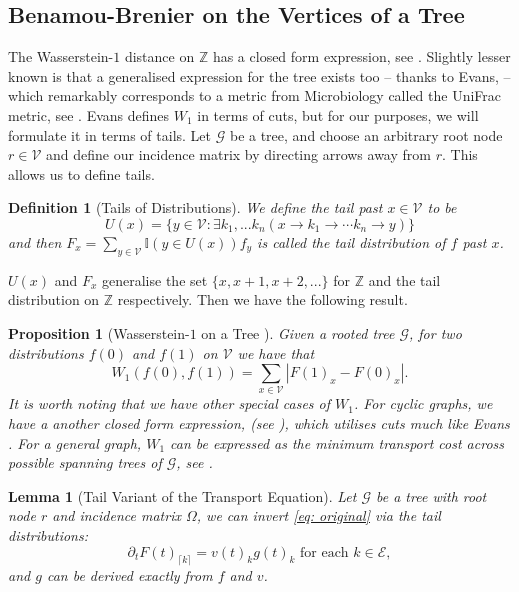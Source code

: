 \documentclass[conference]{IEEEtran}
\newcommand{\GG}{\mathcal{G}}
\newcommand{\VV}{\mathcal{V}}
\newcommand{\EE}{\mathcal{E}}
\newcommand{\ceil}[1]{\lceil #1 \rceil}
\theoremstyle{ieeestyle}
\newtheorem{lem}{Lemma}
\newtheorem{prop}{Proposition}
\newtheorem{defn}{Definition}
\begin{document}
\subsection{Benamou-Brenier on the Vertices of a Tree}\label{sect: tree}
The Wasserstein-$1$ distance on $\mathbb{Z}$ has a closed form expression, see \cite[Lemma 8.2]{bickel1981some}. Slightly lesser known is that a generalised expression for the tree exists too -- thanks to Evans, \cite{evans2012phylogenetic}  -- which remarkably corresponds to a metric from Microbiology called the UniFrac metric, see \cite{lozupone2005unifrac}. Evans defines $W_1$ in terms of cuts, but for our purposes, we will formulate it in terms of tails. Let $\GG$ be a tree, and choose an arbitrary root node $r \in \VV$ and define our incidence matrix by directing arrows away from $r$. This allows us to define tails.
\begin{defn}[Tails of Distributions]
We define the tail  past $x \in \VV$ to be
\begin{equation*}
    U(x) = \{y \in \VV: \exists k_1,...k_n (x \rightarrow k_1 \rightarrow \cdots k_n\rightarrow y) \}
\end{equation*}
and then $F_x = \sum_{y \in \VV}\mathbb{I}(y \in U(x)) f_y$ is called the \textit{tail distribution of} $f$ \textit{past }$x$.
\end{defn}
$U(x)$ and $F_x$ generalise the set $\{x,x+1,x+2,...\}$ for $\mathbb{Z}$ and the tail distribution on $\mathbb{Z}$ respectively. Then we have the following result.
\begin{prop}[Wasserstein-$1$ on a Tree \cite{evans2012phylogenetic}]
    Given a rooted tree $\GG$, for two distributions $f(0)$ and $f(1)$ on $\VV$ we have that
    \begin{equation}\label{eq: tree}
    W_1(f(0),f(1)) = \sum_{x \in \VV}|F(1)_x - F(0)_x|.
\end{equation}
It is worth noting that we have other special cases of $W_1$. For cyclic graphs, we have a another closed form expression, (see \cite{rabin2011transportation}), which utilises cuts much like Evans \cite{evans2012phylogenetic}. For a general graph, $W_1$ can be expressed as the minimum transport cost across possible spanning trees of $\GG$, see \cite{guy2019kantorovich}. 
\end{prop}
\begin{lem}[Tail Variant of the Transport Equation]\label{thm: tail}
    Let $\GG$ be a tree with root node $r$ and incidence matrix $\Omega$, we can invert \eqref{eq: original} via the tail distributions:
\begin{equation} \partial_t F(t)_{\ceil{k}} =  v(t)_{k}g(t)_{k} \text{ for each }k \in \EE,\label{eq:tailpde} \end{equation}
and $g$ can be derived exactly from $f$ and $v$.
\end{lem}
\end{document}
